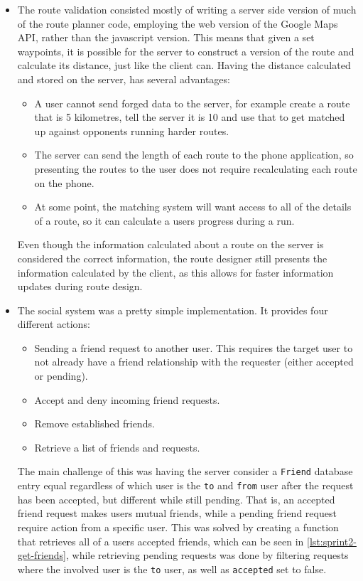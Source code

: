 \begin{itemize}
 \item The route validation consisted mostly of writing a server side version of much of the route planner code, employing the web version of the Google Maps \ac{API}, rather than the javascript version. This means that given a set waypoints, it is possible for the server to construct a version of the route and calculate its distance, just like the client can. Having the distance calculated and stored on the server, has several advantages:
  \begin{itemize}
   \item A user cannot send forged data to the server, for example create a route that is 5 kilometres, tell the server it is 10 and use that to get matched up against opponents running harder routes.
   \item The server can send the length of each route to the phone application, so presenting the routes to the user does not require recalculating each route on the phone.
   \item At some point, the matching system will want access to all of the details of a route, so it can calculate a users progress during a run.
  \end{itemize}
  Even though the information calculated about a route on the server is considered the correct information, the route designer still presents the information calculated by the client, as this allows for faster information updates during route design.
  
 \item The social system was a pretty simple implementation. It provides four different actions:
  \begin{itemize}
   \item Sending a friend request to another user. This requires the target user to not already have a friend relationship with the requester (either accepted or pending).
   \item Accept and deny incoming friend requests.
   \item Remove established friends.
   \item Retrieve a list of friends and requests.
  \end{itemize}
  The main challenge of this was having the server consider a \texttt{Friend} database entry equal regardless of which user is the \texttt{to} and \texttt{from} user after the request has been accepted, but different while still pending. That is, an accepted friend request makes users mutual friends, while a pending friend request require action from a specific user. This was solved by creating a function that retrieves all of a users accepted friends, which can be seen in \autoref{lst:sprint2-get-friends}, while retrieving pending requests was done by filtering requests where the involved user is the \texttt{to} user, as well as \texttt{accepted} set to false.
\end{itemize}

